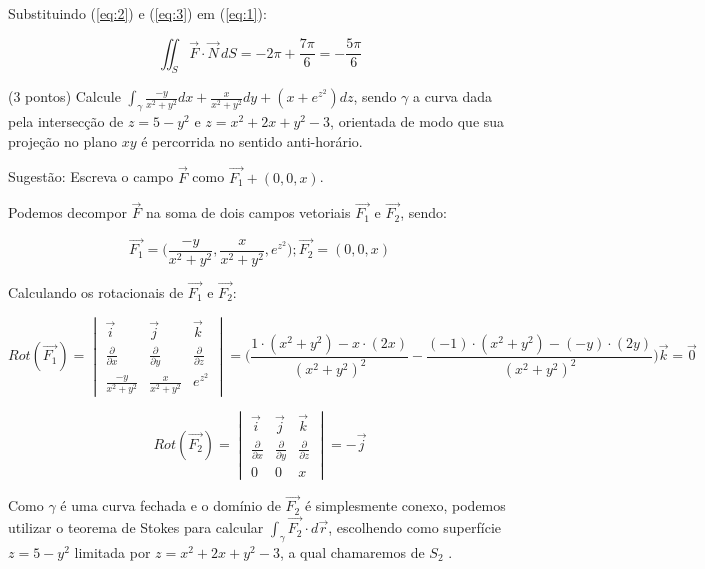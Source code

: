 \documentclass[12pt,a4paper]{article}
\begin{document}
Substituindo (\ref{eq:2}) e (\ref{eq:3}) em (\ref{eq:1}):

$$ \iint_{S} \vec{F} \cdot \vec{N} \,dS = -2\pi + \frac{7\pi}{6} = -\frac{5\pi}{6}  $$
 
\newpage

 (3 pontos) Calcule $\displaystyle\int_{\gamma} \frac{-y}{x^2 + y^2}dx + \frac{x}{x^2 + y^2}dy + (x + e^{z^2})dz$, sendo $\gamma$ a curva dada pela intersecção de $z = 5 - y^2$ e $z = x^2 + 2x + y^2 -3$, orientada de modo que sua projeção no plano $xy$ é percorrida no sentido anti-horário.

Sugestão: Escreva o campo $\vec{F}$ como $\vec{F_1} + (0,0,x)$.


Podemos decompor $\vec{F}$ na soma de dois campos vetoriais $\vec{F_1}$ e $\vec{F_2}$, sendo:

$$ \vec{F_1} =  \Big( \frac{-y}{x^2 + y^2}, \frac{x}{x^2 + y^2}, e^{z^2} \Big) ; \vec{F_2} = ( 0, 0, x ) $$

Calculando os rotacionais de $\vec{F_1}$ e $\vec{F_2}$:

$$ \displaystyle Rot(\vec{F_1}) =
\begin{vmatrix}
\vec{i} & \vec{j} & \vec{k} \\
\frac{\partial}{\partial x} & \frac{\partial}{\partial y} & \frac{\partial}{\partial z}  \\
\frac{-y}{x^2 + y^2}  & \frac{x}{x^2 + y^2} & e^{z^2}
\end{vmatrix} 
= \Big( \frac{1 \cdot (x^2 + y^2) - x \cdot (2x)}{(x^2 + y^2)^2} - \frac{(-1) \cdot (x^2 + y^2) - (-y) \cdot (2y)}{(x^2 + y^2)^2} \Big) \vec{k} = \vec{0} $$

$$ Rot(\vec{F_2}) =
\begin{vmatrix} \vec{i} & \vec{j} & \vec{k} \\
\frac{\partial}{\partial x} & \frac{\partial}{\partial y} & \frac{\partial}{\partial z}  \\
0 & 0 & x
\end{vmatrix} = -\vec{j} $$

Como $\gamma$ é uma curva fechada e o domínio de $\vec{F_2}$ é simplesmente conexo, podemos utilizar o teorema de Stokes para calcular $ \displaystyle \int_{\gamma} \vec{F_2} \cdot d\vec{r} $, escolhendo como superfície  $z = 5 - y^2$ limitada por $z = x^2 + 2x + y^2 -3$, a qual chamaremos de $S_2$ . \\
\end{document}
